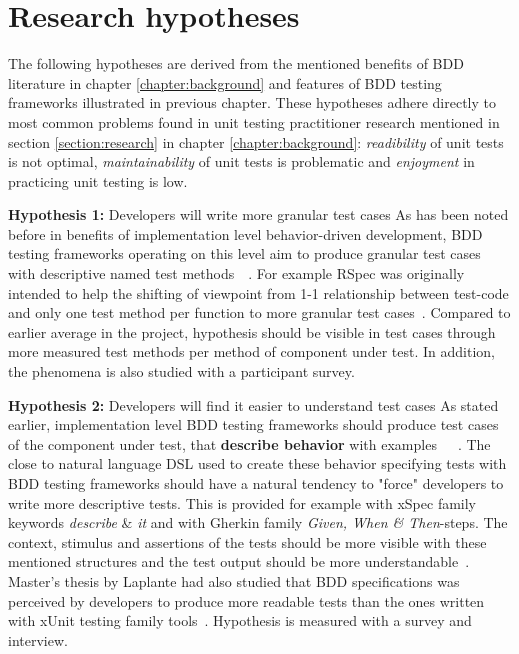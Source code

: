 \section{Research hypotheses}
    The following hypotheses are derived from the mentioned benefits of BDD literature in chapter \ref{chapter:background} and features of BDD
    testing frameworks illustrated in previous chapter. These hypotheses adhere directly to most common problems found in unit
    testing practitioner research mentioned in section \ref{section:research} in chapter \ref{chapter:background}:
    \textit{readibility} of unit tests is not optimal, \textit{maintainability} of unit tests is problematic and \textit{enjoyment}
    in practicing unit testing is low.
    \begin{addmargin}[0em]{0em}
    \vspace{10px}
    \textbf{Hypothesis 1:} Developers will write more granular test cases
    \vspace{5px}
    \newline
    As has been noted before in benefits of implementation level behavior-driven development, BDD testing frameworks operating on this
    level aim to produce granular test cases with descriptive named test methods~\cite{chelimsky2010rspec}~\cite{astels2006new}.
    For example RSpec was originally intended to help the shifting of viewpoint from 1-1 relationship between test-code
    and only one test method per function to more granular test cases~\cite{astels2006new}.
    Compared to earlier average in the project, hypothesis should be visible in test cases through more measured test methods
    per method of component under test. In addition, the phenomena is also studied with a participant survey.
    \end{addmargin}

    \begin{addmargin}[0em]{0em}
    \vspace{10px}
    \textbf{Hypothesis 2:} Developers will find it easier to understand test cases
    \vspace{5px}
    \newline
    As stated earlier, implementation level BDD testing frameworks should produce test cases of the component under test,
    that \textbf{describe behavior} with examples~\cite{chelimsky2010rspec}~\cite{astels2006new}~\cite{amodeo2015learning}.
    The close to natural language DSL used to create these behavior specifying tests with BDD testing frameworks should
    have a natural tendency to "force" developers to write more descriptive tests. This is provided for example
    with xSpec family keywords \textit{describe} \& \textit{it} and with Gherkin family \textit{Given, When \& Then}-steps.
    The context, stimulus and assertions of the tests should be more visible with these mentioned structures and the test output
    should be more understandable~\cite{smart2014bdd}. Master's thesis by Laplante had also studied that BDD specifications
    was perceived by developers to produce more readable tests than the ones written with xUnit testing family tools~\cite{laplante2009behavior}.
    Hypothesis is measured with a survey and interview.
    \end{addmargin}

